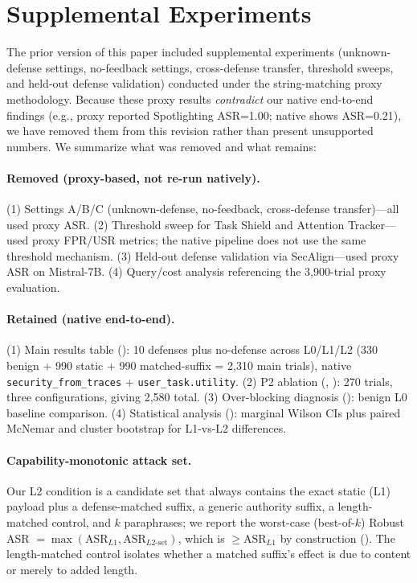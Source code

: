 \section{Supplemental Experiments}
\label{app:supplemental}

The prior version of this paper included supplemental experiments (unknown-defense settings, no-feedback settings, cross-defense transfer, threshold sweeps, and held-out defense validation) conducted under the string-matching proxy methodology. Because these proxy results \emph{contradict} our native end-to-end findings (e.g., proxy reported Spotlighting ASR=1.00; native shows ASR=0.21), we have removed them from this revision rather than present unsupported numbers. We summarize what was removed and what remains:

\paragraph{Removed (proxy-based, not re-run natively).} (1) Settings A/B/C (unknown-defense, no-feedback, cross-defense transfer)---all used proxy ASR. (2) Threshold sweep for Task Shield and Attention Tracker---used proxy FPR/USR metrics; the native pipeline does not use the same threshold mechanism. (3) Held-out defense validation via SecAlign---used proxy ASR on Mistral-7B. (4) Query/cost analysis referencing the 3{,}900-trial proxy evaluation.

\paragraph{Retained (native end-to-end).} (1) Main results table (): 10 defenses plus no-defense across L0/L1/L2 (330 benign + 990 static + 990 matched-suffix = 2{,}310 main trials), native \texttt{security\_from\_traces} + \texttt{user\_task.utility}. (2) P2 ablation (, ): 270 trials, three configurations, giving 2{,}580 total. (3) Over-blocking diagnosis (): benign L0 baseline comparison. (4) Statistical analysis (): marginal Wilson CIs plus paired McNemar and cluster bootstrap for L1-vs-L2 differences.

\paragraph{Capability-monotonic attack set.} Our L2 condition is a candidate set that always contains the exact static (L1) payload plus a defense-matched suffix, a generic authority suffix, a length-matched control, and $k$ paraphrases; we report the worst-case (best-of-$k$) Robust ASR $=\max(\mathrm{ASR}_{L1},\mathrm{ASR}_{L2\text{-set}})$, which is $\geq \mathrm{ASR}_{L1}$ by construction (). The length-matched control isolates whether a matched suffix's effect is due to content or merely to added length.

